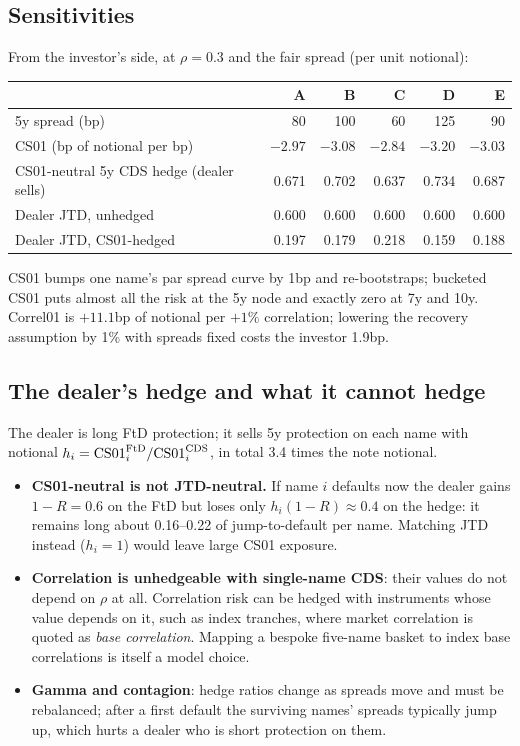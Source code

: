 \documentclass[11pt,a4paper]{article}
\begin{document}
\subsection{Sensitivities}
From the investor's side, at $\rho=0.3$ and the fair spread (per unit notional):
\begin{center}\small
\begin{tabular}{lrrrrr}\toprule
& A & B & C & D & E\\\midrule
5y spread (bp) & 80 & 100 & 60 & 125 & 90\\
CS01 (bp of notional per bp) & $-2.97$ & $-3.08$ & $-2.84$ & $-3.20$ & $-3.03$\\
CS01-neutral 5y CDS hedge (dealer sells) & 0.671 & 0.702 & 0.637 & 0.734 & 0.687\\
Dealer JTD, unhedged & 0.600 & 0.600 & 0.600 & 0.600 & 0.600\\
Dealer JTD, CS01-hedged & 0.197 & 0.179 & 0.218 & 0.159 & 0.188\\\bottomrule
\end{tabular}
\end{center}
CS01 bumps one name's par spread curve by 1bp and re-bootstraps; bucketed CS01 puts almost all the risk
at the 5y node and exactly zero at 7y and 10y. Correl01 is $+11.1$bp of notional per $+1\%$ correlation;
lowering the recovery assumption by 1\% with spreads fixed costs the investor 1.9bp.

\subsection{The dealer's hedge and what it cannot hedge}
The dealer is long FtD protection; it sells 5y protection on each name with notional
$h_i=\mathrm{CS01}^{\rm FtD}_i/\mathrm{CS01}^{\rm CDS}_i$, in total 3.4 times the note notional.
\begin{itemize}[nosep]
\item \textbf{CS01-neutral is not JTD-neutral.} If name $i$ defaults now the dealer gains $1-R=0.6$ on the
FtD but loses only $h_i(1-R)\approx0.4$ on the hedge: it remains long about 0.16--0.22 of jump-to-default
per name. Matching JTD instead ($h_i=1$) would leave large CS01 exposure.
\item \textbf{Correlation is unhedgeable with single-name CDS}: their values do not depend on $\rho$
at all. Correlation risk can be hedged with instruments whose value depends on it, such as index tranches,
where market correlation is quoted as \emph{base correlation}. Mapping a bespoke five-name basket to
index base correlations is itself a model choice.
\item \textbf{Gamma and contagion}: hedge ratios change as spreads move and must be rebalanced; after a
first default the surviving names' spreads typically jump up, which hurts a dealer who is short protection
on them.
\end{itemize}
\end{document}
